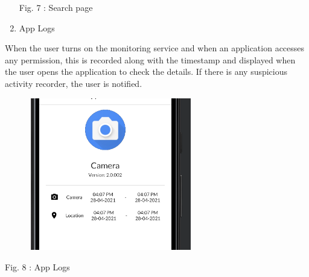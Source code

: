 \documentclass[12pt]{report}
\renewcommand{\_}{\kern-1.5pt\textunderscore\kern-1.5pt}
\begin{document}
\begin{multicols}{2}
\begin{enumerate}


\vspace{\baselineskip}\begin{Center}
{\fontsize{10pt}{12.0pt}\selectfont Fig. 7 : Search page}
\end{Center}

\vspace{\baselineskip}

\vspace{\baselineskip}
	\item {\fontsize{10pt}{12.0pt}\selectfont App Logs}
\end{enumerate}
\begin{justify}
{\fontsize{10pt}{12.0pt}\selectfont When the user turns on the monitoring service and when an application accesses any permission, this is recorded along with the timestamp and displayed when the user opens the application to check the details. If there is any suspicious activity recorder, the user is notified.\par}
\end{justify}



\begin{figure}[H]
	\begin{Center}
		\includegraphics[width=2.82in,height=2.62in]{./media/image6.png}
	\end{Center}
\end{figure}




\vspace{\baselineskip}\begin{Center}
{\fontsize{10pt}{12.0pt}\selectfont Fig. 8 : App Logs}
\end{Center}


\end{multicols}
\end{document}
